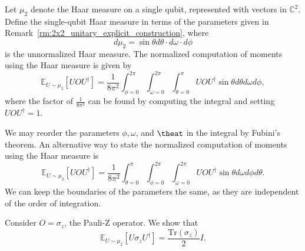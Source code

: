 \begin{definition}\label{def:single_qubit_haar_measure}
    Let $\mu_{2}$ denote the Haar measure on a single qubit, represented with vectors in $\mathbb{C}^{2}$.
    Define the {single-qubit Haar measure} in terms of the parameters given in Remark~\ref{rm:2x2_unitary_explicit_construction}, where
    \begin{equation}
        d\mu_{2} = \sin{\theta} d\theta \cdot d\omega \cdot d\phi
    \end{equation}
    is the unnormalized Haar measure.
    The normalized computation of moments using the Haar measure is given by
    \begin{equation}\label{eq:normalized_haar_meas}
       \mathbb{E}_{U \sim \mu_{2}} [U O U^{\dagger}] = \frac{1}{8\pi^2} \int_{\phi = 0}^{2\pi} \int_{\omega = 0}^{2\pi} \int_{\theta = 0}^{\pi} U O U^{\dagger} \sin{\theta} d\theta d\omega d\phi,
    \end{equation}
    where the factor of $\frac{1}{8\pi^2}$ can be found by computing the integral and setting $UOU^{\dagger} =1$.
\end{definition}

\begin{remark}
    We may reorder the parameters $\phi, \omega$, and $\theat$ in the integral by Fubini's theorem.
    An alternative way to state the normalized computation of moments using the Haar measure is
    \begin{equation}
        \mathbb{E}_{U \sim \mu_{2}} [U O U^{\dagger}] = \frac{1}{8\pi^2} \int_{\theta = 0}^{\pi} \int_{\phi = 0}^{2\pi} \int_{\omega = 0}^{2\pi} U O U^{\dagger} \sin{\theta} d\omega d\phi d\theta.
    \end{equation}
    We can keep the boundaries of the parameters the same, as they are independent of the order of integration.
\end{remark}


\begin{theorem}
    Consider $O = \sigma_{z}$, the Pauli-Z operator.
    We show that
    \begin{equation}
        \mathbb{E}_{U \sim \mu_{2}} [U\sigma_{z}U^{\dagger}] = \frac{\text{Tr}(\sigma_{z})}{2} I.
    \end{equation}
\end{theorem}

